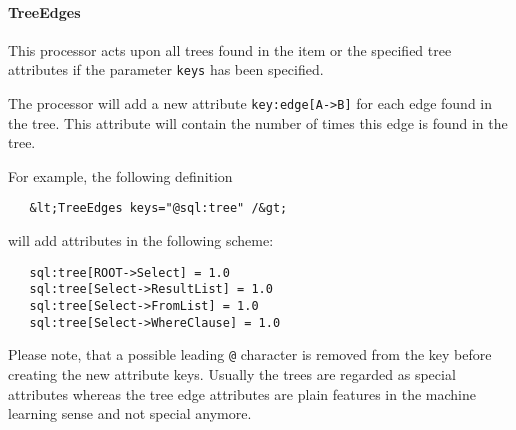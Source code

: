 \paragraph{TreeEdges}

This processor acts upon all trees found in the item or the specified
tree attributes if the parameter \texttt{keys} has been specified.

The processor will add a new attribute
\texttt{key:edge{[}A-\textgreater{}B{]}} for each edge found in the
tree. This attribute will contain the number of times this edge is found
in the tree.

For example, the following definition

\begin{verbatim}
   &lt;TreeEdges keys="@sql:tree" /&gt;
\end{verbatim}
will add attributes in the following scheme:

\begin{verbatim}
   sql:tree[ROOT->Select] = 1.0
   sql:tree[Select->ResultList] = 1.0
   sql:tree[Select->FromList] = 1.0
   sql:tree[Select->WhereClause] = 1.0
\end{verbatim}
Please note, that a possible leading \texttt{@} character is removed
from the key before creating the new attribute keys. Usually the trees
are regarded as special attributes whereas the tree edge attributes are
plain features in the machine learning sense and not special anymore.


